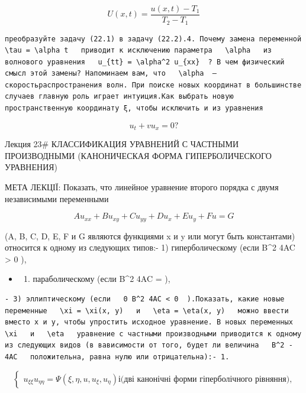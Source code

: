 \documentclass[
  ukrainian,
]{article}
\providecommand{\tightlist}{%
  \setlength{\itemsep}{0pt}\setlength{\parskip}{0pt}}
\begin{document}
\[
U(x, t) = \frac{u(x, t) - T_1}{T_2 - T_1}
\]

\begin{verbatim}
преобразуйте задачу (22.1) в задачу (22.2).4. Почему замена переменной   \tau = \alpha t   приводит к исключению параметра   \alpha   из волнового уравнения   u_{tt} = \alpha^2 u_{xx}  ? В чем физический смысл этой замены? Напоминаем вам, что   \alpha  —скоростьраспространения волн. При поиске новых координат в большинстве случаев главную роль играет интуиция.Как выбрать новую пространственную координату ξ, чтобы исключить и из уравнения
\end{verbatim}

\[
u_t + vu_x = 0?
\]

Лекция 23\# КЛАССИФИКАЦИЯ УРАВНЕНИЙ С ЧАСТНЫМИ ПРОИЗВОДНЫМИ
(КАНОНИЧЕСКАЯ ФОРМА ГИПЕРБОЛИЧЕСКОГО УРАВНЕНИЯ)

МЕТА ЛЕКЦІЇ: Показать, что линейное уравнение второго порядка с двумя
независимыми переменными

\[
Au_{xx} + Bu_{xy} + Cu_{yy} + Du_x + Eu_y + Fu = G
\]

(A, B, C, D, E, F и G являются функциями x и y или могут быть
константами) относится к одному из следующих типов:- 1) гиперболическому
(если B\^{}2 4AC \textgreater{} 0 ),

\begin{itemize}
\tightlist
\item
  \begin{enumerate}
  \def\labelenumi{\arabic{enumi})}
  \setcounter{enumi}{1}
  \tightlist
  \item
    параболическому (если B\^{}2 4AC = ),
  \end{enumerate}
\end{itemize}

\begin{verbatim}
- 3) эллиптическому (если   0 B^2 4AC < 0  ).Показать, какие новые переменные   \xi = \xi(x, y)   и   \eta = \eta(x, y)   можно ввести вместо x и y, чтобы упростить исходное уравнение. В новых переменных   \xi   и   \eta   уравнение с частными производными приводится к одному из следующих видов (в вависимости от того, будет ли величина   B^2 - 4AC   положительна, равна нулю или отрицательна):- 1.  
\end{verbatim}

\[
\begin{cases} u_{\xi\xi} u_{\eta\eta} = \Psi(\xi,  \eta, u, u_{\xi}, u_{\eta}) і \text{(дві канонічні форми гіперболічного рівняння),} \end{cases}
\]
\end{document}
